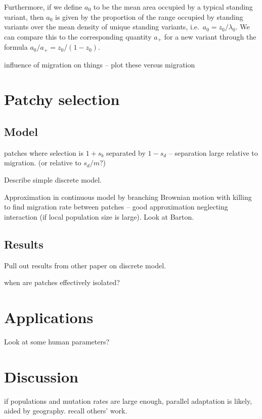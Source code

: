 \documentclass{article}
\begin{document}
Furthermore, if we define $a_0$ to be the mean area occupied by a typical standing variant, 
then $a_0$ is given by the proportion of the range occupied by standing variants over the mean density of unique standing variants,
i.e.\ $a_0 = z_0 / \lambda_0$.
We can compare this to the corresponding quantity $a_+$ for a new variant through the formula
$a_0 / a_+ = z_0 / (1-z_0)$.


influence of migration on things -- plot these versus migration 


\section{Patchy selection} 

\subsection{Model} 

patches where selection is $1+s_b$ separated by $1-s_d$ -- separation large relative to migration.   
(or relative to $s_d/m$?) 

Describe simple discrete model. 

Approximation in continuous model by branching Brownian motion with killing to find migration rate between patches -- 
good approximation neglecting interaction (if local population size is large). 
Look at Barton. 

\subsection{Results} 

Pull out results from other paper on discrete model. 

when are patches effectively isolated? 

\section{Applications} 

Look at some human parameters? 

\section{Discussion} 

if populations and mutation rates are large enough, parallel adaptation is likely, aided by geography. 
recall others' work. 
\end{document}
